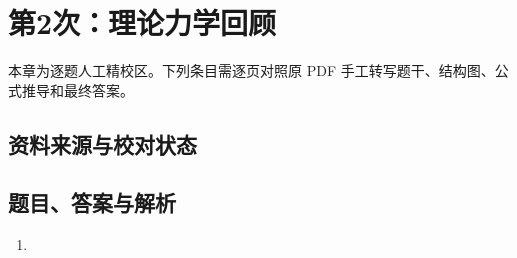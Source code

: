 \chapter{第2次：理论力学回顾}

本章为逐题人工精校区。下列条目需逐页对照原 PDF 手工转写题干、结构图、公式推导和最终答案。

\section{资料来源与校对状态}


\section{题目、答案与解析}

\begin{enumerate}[label=\textbf{第\arabic*题},wide]
  \item
  \begin{problemBox}
  \end{problemBox}

  \begin{solutionBox}
  \end{solutionBox}
\end{enumerate}
